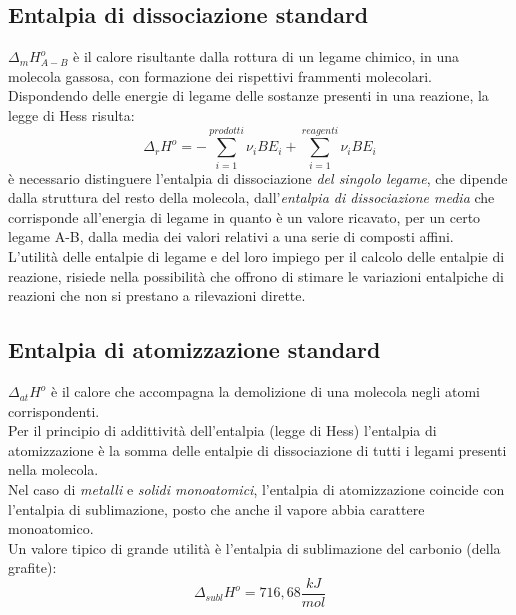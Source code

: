 \documentclass{article}
\begin{document}
\subsection{Entalpia di dissociazione standard}
$\Delta_mH^o_{A-B}$ è il calore risultante dalla rottura di un legame chimico, in una molecola gassosa, con formazione dei rispettivi frammenti molecolari. \\
Dispondendo delle energie di legame delle sostanze presenti in una reazione, la legge di Hess risulta:
\begin{equation*}
    \Delta_rH^o=-\sum_{i=1}^{prodotti}\nu_iBE_i+\sum_{i=1}^{reagenti}\nu_iBE_i
\end{equation*}
è necessario distinguere l'entalpia di dissociazione \textit{del singolo legame}, che dipende dalla struttura del resto della molecola, dall'\textit{entalpia di dissociazione media} che corrisponde all'energia di legame in quanto è un valore ricavato, per un certo legame A-B, dalla media dei valori relativi a una serie di composti affini.\\
L'utilità delle entalpie di legame e del loro impiego per il calcolo delle entalpie di reazione, risiede nella possibilità che offrono di stimare le variazioni entalpiche di reazioni che non si prestano a rilevazioni dirette.


\subsection{Entalpia di atomizzazione standard}
$\Delta_{at}H^o$ è il calore che accompagna la demolizione di una molecola negli atomi corrispondenti. \\
Per il principio di addittività dell'entalpia (legge di Hess) l'entalpia di atomizzazione è la somma delle entalpie di dissociazione di tutti i legami presenti nella molecola.\\
Nel caso di \textit{metalli} e \textit{solidi monoatomici}, l'entalpia di atomizzazione coincide con l'entalpia di sublimazione, posto che anche il vapore abbia carattere monoatomico. \\
Un valore tipico di grande utilità è l'entalpia di sublimazione del carbonio (della grafite):
\begin{equation*}
    \Delta_{subl}H^o=716,68 \frac{kJ}{mol}
\end{equation*}
\end{document}

